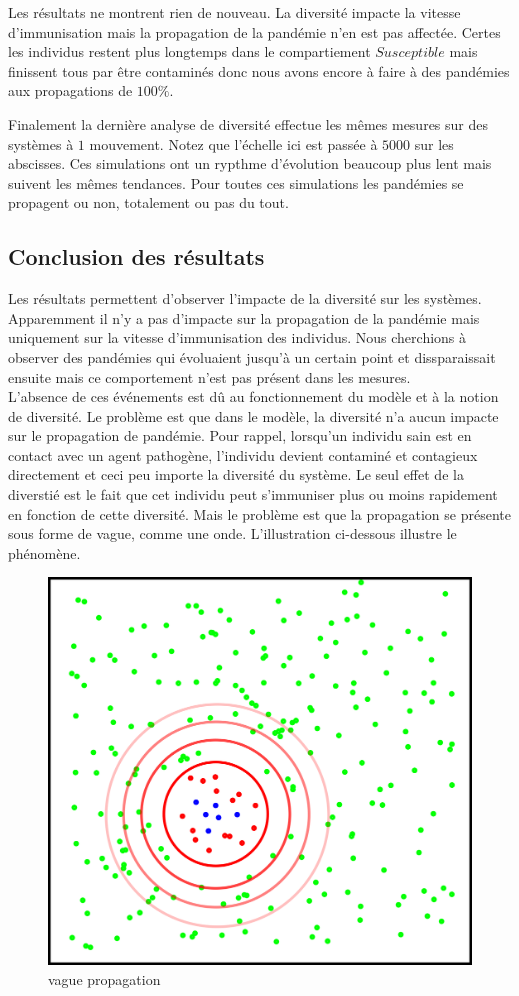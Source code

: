 Les résultats ne montrent rien de nouveau. La diversité impacte la vitesse d'immunisation mais la propagation de la pandémie n'en est pas affectée. Certes les individus restent plus longtemps dans le compartiement $Susceptible$ mais finissent tous par être contaminés donc nous avons encore à faire à des pandémies aux propagations de $100\%$.


Finalement la dernière analyse de diversité effectue les mêmes mesures sur des systèmes à $1$ mouvement. Notez que l'échelle ici est passée à $5000$ sur les abscisses. Ces simulations ont un rypthme d'évolution beaucoup plus lent mais suivent les mêmes tendances. Pour toutes ces simulations les pandémies se propagent ou non, totalement ou pas du tout.

\subsection{Conclusion des résultats}

Les résultats permettent d'observer l'impacte de la diversité sur les systèmes. Apparemment il n'y a pas d'impacte sur la propagation de la pandémie mais uniquement sur la vitesse d'immunisation des individus. Nous cherchions à observer des pandémies qui évoluaient jusqu'à un certain point et dissparaissait ensuite mais ce comportement n'est pas présent dans les mesures.\\

L'absence de ces événements est dû au fonctionnement du modèle et à la notion de diversité. Le problème est que dans le modèle, la diversité n'a aucun impacte sur le propagation de pandémie. Pour rappel, lorsqu'un individu sain est en contact avec un agent pathogène, l'individu devient contaminé et contagieux directement et ceci peu importe la diversité du système. Le seul effet de la diverstié est le fait que cet individu peut s'immuniser plus ou moins rapidement en fonction de cette diversité. Mais le problème est que la propagation se présente sous forme de vague, comme une onde. L'illustration ci-dessous illustre le phénomène.

\begin{figure}[h]
	\centering
	\captionsetup{justification=centering}
	\includegraphics[width=.5\textwidth]{Images/vague_propagation.png}
	\caption{vague propagation}
\end{figure}

